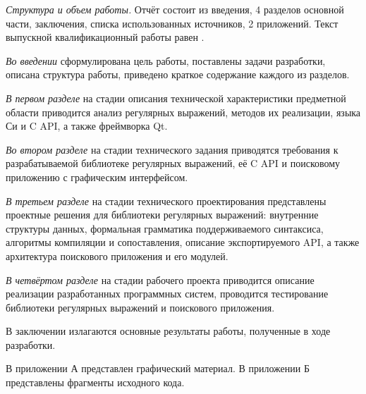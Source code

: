 \emph{Структура и объем работы.} Отчёт состоит из введения, 4 разделов основной части, заключения, списка использованных источников, 2 приложений. Текст выпускной квалификационный работы равен .

\emph{Во введении} сформулирована цель работы, поставлены задачи разработки, описана структура работы, приведено краткое содержание каждого из разделов.

\emph{В первом разделе} на стадии описания технической характеристики предметной области приводится анализ регулярных выражений, методов их реализации, языка Си и C API, а также фреймворка Qt.

\emph{Во втором разделе} на стадии технического задания приводятся требования к разрабатываемой библиотеке регулярных выражений, её C API и поисковому приложению с графическим интерфейсом.

\emph{В третьем разделе} на стадии технического проектирования представлены проектные решения для библиотеки регулярных выражений: внутренние структуры данных, формальная грамматика поддерживаемого синтаксиса, алгоритмы компиляции и сопоставления, описание экспортируемого API, а также архитектура поискового приложения и его модулей.

\emph{В четвёртом разделе} на стадии рабочего проекта приводится описание реализации разработанных программных систем, проводится тестирование библиотеки регулярных выражений и поискового приложения.

В заключении излагаются основные результаты работы, полученные в ходе разработки.

В приложении А представлен графический материал. В приложении Б представлены фрагменты исходного кода. 
